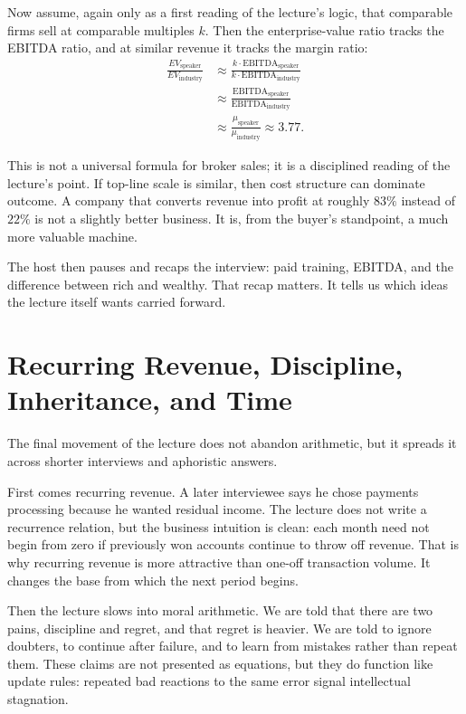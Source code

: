 Now assume, again only as a first reading of the lecture's logic, that comparable firms sell at comparable multiples \(k\). Then the enterprise-value ratio tracks the EBITDA ratio, and at similar revenue it tracks the margin ratio:
\begin{align}
\frac{EV_{\text{speaker}}}{EV_{\text{industry}}}
&\approx
\frac{k\cdot \text{EBITDA}_{\text{speaker}}}{k\cdot \text{EBITDA}_{\text{industry}}}\\
&\approx
\frac{\text{EBITDA}_{\text{speaker}}}{\text{EBITDA}_{\text{industry}}}\\
&\approx
\frac{\mu_{\text{speaker}}}{\mu_{\text{industry}}}
\approx 3.77.
\end{align}

This is not a universal formula for broker sales; it is a disciplined reading of the lecture's point. If top-line scale is similar, then cost structure can dominate outcome. A company that converts revenue into profit at roughly \(83\%\) instead of \(22\%\) is not a slightly better business. It is, from the buyer's standpoint, a much more valuable machine.

The host then pauses and recaps the interview: paid training, EBITDA, and the difference between rich and wealthy. That recap matters. It tells us which ideas the lecture itself wants carried forward.

\section{Recurring Revenue, Discipline, Inheritance, and Time}

The final movement of the lecture does not abandon arithmetic, but it spreads it across shorter interviews and aphoristic answers.

First comes recurring revenue. A later interviewee says he chose payments processing because he wanted residual income. The lecture does not write a recurrence relation, but the business intuition is clean: each month need not begin from zero if previously won accounts continue to throw off revenue. That is why recurring revenue is more attractive than one-off transaction volume. It changes the base from which the next period begins.

Then the lecture slows into moral arithmetic. We are told that there are two pains, discipline and regret, and that regret is heavier. We are told to ignore doubters, to continue after failure, and to learn from mistakes rather than repeat them. These claims are not presented as equations, but they do function like update rules: repeated bad reactions to the same error signal intellectual stagnation.

